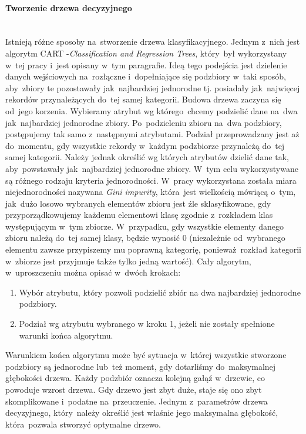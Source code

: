 \paragraph{Tworzenie drzewa decyzyjnego}\mbox{}\\
Istnieją różne sposoby na~stworzenie drzewa klasyfikacyjnego. Jednym z~nich jest algorytm CART -\textit{Classification  and  Regression  Trees}\cite{CART}, który~był wykorzystany w~tej pracy i~jest opisany w~tym paragrafie. Ideą tego podejścia jest dzielenie danych wejściowych na~rozłączne i~dopełniające się podzbiory w~taki sposób, aby~zbiory te pozostawały jak~najbardziej jednorodne tj. posiadały jak~najwięcej rekordów przynależących do~tej samej kategorii. Budowa drzewa zaczyna się od~jego korzenia. Wybieramy atrybut wg którego~chcemy podzielić dane na~dwa jak~najbardziej jednorodne zbiory. Po~podzieleniu zbioru na~dwa podzbiory, postępujemy tak samo z~następnymi atrybutami. Podział przeprowadzany jest aż do~momentu, gdy wszystkie rekordy w~każdym podzbiorze przynależą do~tej samej kategorii. Należy jednak określić wg których atrybutów dzielić dane tak, aby~powstawały jak~najbardziej jednorodne zbiory. W~tym celu wykorzystywane są różnego rodzaju kryteria jednorodności\cite{CART}. W~pracy wykorzystana została miara niejednorodności nazywana \textit{Gini impurity}, która~jest wielkością mówiącą o~tym, jak~dużo losowo wybranych elementów zbioru jest źle sklasyfikowane, gdy przyporządkowujemy każdemu elementowi klasę zgodnie z~rozkładem klas występującym w~tym zbiorze. W~przypadku, gdy wszystkie elementy danego zbioru należą do~tej samej klasy,  będzie wynosić 0 (niezależnie od~wybranego elementu zawsze przypiszemy mu poprawną kategorię, ponieważ~rozkład kategorii w~zbiorze jest przyjmuje także tylko jedną wartość). Cały algorytm, w~uproszczeniu można opisać w~dwóch krokach:
\begin{enumerate}
\item Wybór atrybutu, który pozwoli podzielić zbiór na dwa najbardziej jednorodne podzbiory.
\item Podział wg atrybutu wybranego w kroku 1, jeżeli nie zostały spełnione warunki końca algorytmu.
\end{enumerate}
Warunkiem końca algorytmu może być sytuacja w~której wszystkie stworzone podzbiory są jednorodne lub~też moment, gdy dotarliśmy do~maksymalnej głębokości drzewa. Każdy podzbiór oznacza kolejną gałąź w~drzewie, co powoduje wzrost drzewa. Gdy drzewo jest zbyt duże, staje się ono zbyt skomplikowane i~podatne na~przeuczenie. Jednym z~parametrów drzewa decyzyjnego, który~należy określić jest właśnie jego maksymalna głębokość, która~pozwala stworzyć optymalne drzewo.

